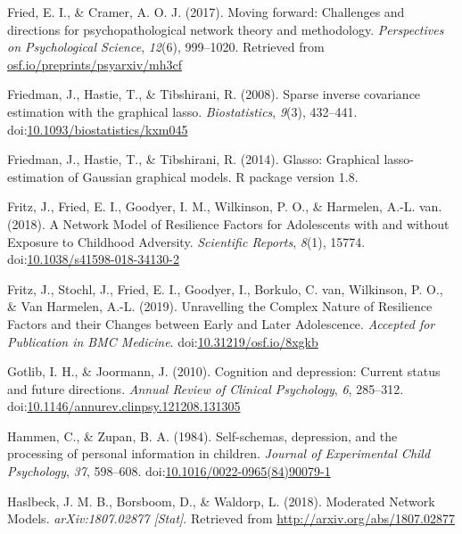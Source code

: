 \documentclass[man,floatsintext]{apa6}
\begin{document}
\leavevmode\hypertarget{ref-fried_moving_2017}{}%
Fried, E. I., \& Cramer, A. O. J. (2017). Moving forward: Challenges and directions for psychopathological network theory and methodology. \emph{Perspectives on Psychological Science}, \emph{12}(6), 999--1020. Retrieved from \url{osf.io/preprints/psyarxiv/mh3cf}

\leavevmode\hypertarget{ref-friedman_sparse_2008}{}%
Friedman, J., Hastie, T., \& Tibshirani, R. (2008). Sparse inverse covariance estimation with the graphical lasso. \emph{Biostatistics}, \emph{9}(3), 432--441. doi:\href{https://doi.org/10.1093/biostatistics/kxm045}{10.1093/biostatistics/kxm045}

\leavevmode\hypertarget{ref-friedman_glasso:_2014}{}%
Friedman, J., Hastie, T., \& Tibshirani, R. (2014). Glasso: Graphical lasso- estimation of Gaussian graphical models. R package version 1.8.

\leavevmode\hypertarget{ref-fritz_network_2018}{}%
Fritz, J., Fried, E. I., Goodyer, I. M., Wilkinson, P. O., \& Harmelen, A.-L. van. (2018). A Network Model of Resilience Factors for Adolescents with and without Exposure to Childhood Adversity. \emph{Scientific Reports}, \emph{8}(1), 15774. doi:\href{https://doi.org/10.1038/s41598-018-34130-2}{10.1038/s41598-018-34130-2}

\leavevmode\hypertarget{ref-fritz_unravelling_2019}{}%
Fritz, J., Stochl, J., Fried, E. I., Goodyer, I., Borkulo, C. van, Wilkinson, P. O., \& Van Harmelen, A.-L. (2019). Unravelling the Complex Nature of Resilience Factors and their Changes between Early and Later Adolescence. \emph{Accepted for Publication in BMC Medicine}. doi:\href{https://doi.org/10.31219/osf.io/8xgkb}{10.31219/osf.io/8xgkb}

\leavevmode\hypertarget{ref-Gotlib2010}{}%
Gotlib, I. H., \& Joormann, J. (2010). Cognition and depression: Current status and future directions. \emph{Annual Review of Clinical Psychology}, \emph{6}, 285--312. doi:\href{https://doi.org/10.1146/annurev.clinpsy.121208.131305}{10.1146/annurev.clinpsy.121208.131305}

\leavevmode\hypertarget{ref-Hammen1984}{}%
Hammen, C., \& Zupan, B. A. (1984). Self-schemas, depression, and the processing of personal information in children. \emph{Journal of Experimental Child Psychology}, \emph{37}, 598--608. doi:\href{https://doi.org/10.1016/0022-0965(84)90079-1}{10.1016/0022-0965(84)90079-1}

\leavevmode\hypertarget{ref-haslbeck_moderated_2018}{}%
Haslbeck, J. M. B., Borsboom, D., \& Waldorp, L. (2018). Moderated Network Models. \emph{arXiv:1807.02877 {[}Stat{]}}. Retrieved from \url{http://arxiv.org/abs/1807.02877}
\end{document}
